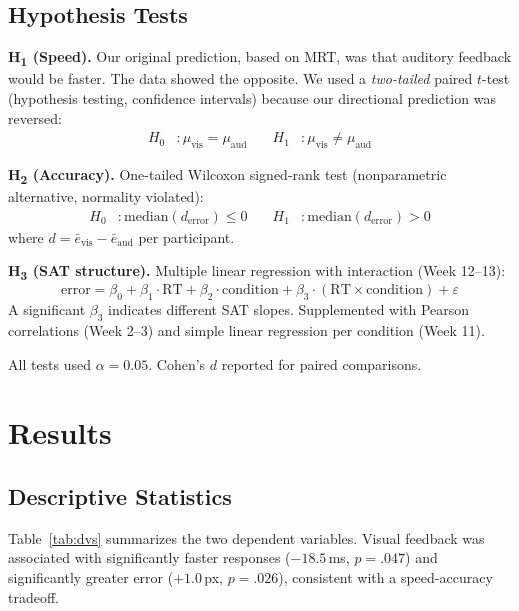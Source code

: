 \documentclass[12pt,letterpaper]{article}
\begin{document}
\subsection{Hypothesis Tests}

\textbf{H\textsubscript{1} (Speed).} Our original prediction, based on MRT, was that auditory feedback would be faster. The data showed the opposite. We used a \emph{two-tailed} paired $t$-test (hypothesis testing, confidence intervals) because our directional prediction was reversed:
\vspace{-4pt}
\begin{align*}
  H_0 &: \mu_{\text{vis}} = \mu_{\text{aud}} &\quad H_1 &: \mu_{\text{vis}} \neq \mu_{\text{aud}}
\end{align*}

\textbf{H\textsubscript{2} (Accuracy).} One-tailed Wilcoxon signed-rank test (nonparametric alternative, normality violated):
\vspace{-4pt}
\begin{align*}
  H_0 &: \text{median}(d_{\text{error}}) \leq 0 &\quad H_1 &: \text{median}(d_{\text{error}}) > 0
\end{align*}
where $d = \bar{e}_{\text{vis}} - \bar{e}_{\text{aud}}$ per participant.

\textbf{H\textsubscript{3} (SAT structure).} Multiple linear regression with interaction (Week 12--13):
\[
  \text{error} = \beta_0 + \beta_1 \!\cdot\! \text{RT} + \beta_2 \!\cdot\! \text{condition} + \beta_3 \!\cdot\! (\text{RT} \times \text{condition}) + \varepsilon
\]
A significant $\beta_3$ indicates different SAT slopes. Supplemented with Pearson correlations (Week 2--3) and simple linear regression per condition (Week 11).

All tests used $\alpha = 0.05$. Cohen's $d$ reported for paired comparisons.


\section{Results}

\subsection{Descriptive Statistics}

Table~\ref{tab:dvs} summarizes the two dependent variables. Visual feedback was associated with significantly faster responses ($-18.5$\,ms, $p = .047$) and significantly greater error ($+1.0$\,px, $p = .026$), consistent with a speed-accuracy tradeoff.
\end{document}
